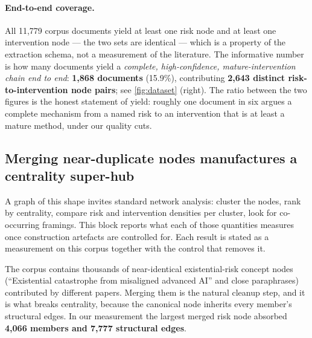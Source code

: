 \documentclass[10pt,twocolumn,letterpaper]{article}
\begin{document}
\paragraph{End-to-end coverage.} All 11{,}779 corpus documents yield at least one risk
node and at least one intervention node --- the two sets are identical --- which is a
property of the extraction schema, not a measurement of the literature. The informative
number is how many documents yield a \emph{complete, high-confidence,
mature-intervention chain end to end}: \textbf{1{,}868 documents} (15.9\%), contributing
\textbf{2{,}643 distinct risk-to-intervention node pairs}; see \cref{fig:dataset}
(right). The ratio between the two figures is the honest
statement of yield: roughly one document in six argues a complete mechanism from a named
risk to an intervention that is at least a mature method, under our quality cuts.

\subsection{Merging near-duplicate nodes manufactures a centrality super-hub}
\label{sec:r-hub}

A graph of this shape invites standard network analysis: cluster the nodes, rank by
centrality, compare risk and intervention densities per cluster, look for co-occurring
framings. This block reports what each of those quantities measures once construction
artefacts are controlled for. Each result is stated as a measurement on this corpus
together with the control that removes it.

The corpus contains thousands of near-identical existential-risk concept nodes
(``Existential catastrophe from misaligned advanced AI'' and close paraphrases)
contributed by different papers. Merging them is the natural cleanup step, and it is
what breaks centrality, because the canonical node inherits every member's structural
edges. In our measurement the largest merged risk node absorbed \textbf{4{,}066 members
and 7{,}777 structural edges}.
\end{document}
